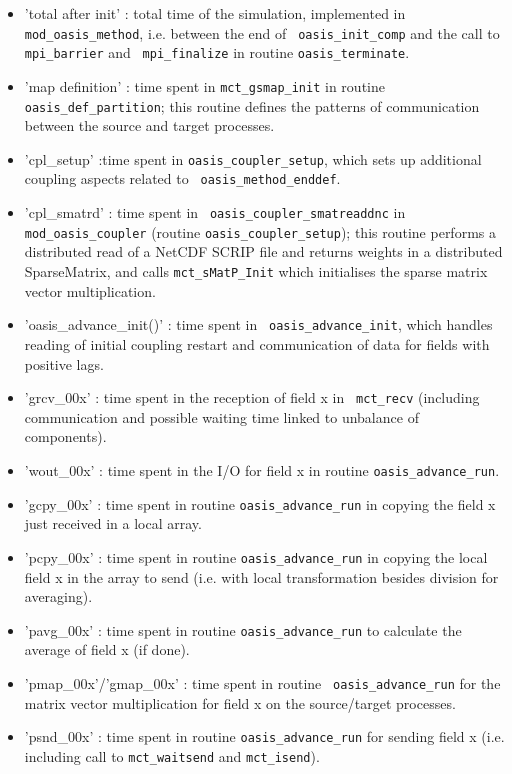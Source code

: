 \begin{itemize}
\item {'total after init'} : total time of the simulation, implemented
  in {\tt mod\_oasis\_method}, i.e. between the end of {\tt
    oasis\_init\_comp} and the call to {\tt mpi\_barrier} and {\tt
    mpi\_finalize} in routine {\tt oasis\_terminate}.
\item {'map definition'} : time spent in {\tt mct\_gsmap\_init} in
  routine {\tt oasis\_def\_partition}; this routine defines the
  patterns of communication between the source and target processes.
\item {'cpl\_setup'} :time spent in {\tt oasis\_coupler\_setup}, which
  sets up additional coupling aspects related to {\tt
    oasis\_method\_enddef}.
\item {'cpl\_smatrd'} : time spent in {\tt
    oasis\_coupler\_smatreaddnc} in {\tt mod\_oasis\_coupler} (routine
  {\tt oasis\_coupler\_setup}); this routine performs a distributed
  read of a NetCDF SCRIP file and returns weights in a distributed
  SparseMatrix, and calls {\tt mct\_sMatP\_Init} which initialises the
  sparse matrix vector multiplication.
\item {'oasis\_advance\_init()'} : time spent in {\tt
    oasis\_advance\_init}, which handles reading of initial coupling
  restart and communication of data for fields with positive lags.
\item {'grcv\_00x'} : time spent in the reception of field x in {\tt
    mct\_recv} (including communication and possible waiting time
  linked to unbalance of components).
\item {'wout\_00x'} : time spent in the I/O for field x in routine
  {\tt oasis\_advance\_run}.
\item {'gcpy\_00x'} : time spent in routine {\tt oasis\_advance\_run}
  in copying the field x just received in a local array.
\item {'pcpy\_00x'} : time spent in routine {\tt oasis\_advance\_run}
  in copying the local field x in the array to send (i.e. with local
  transformation besides division for averaging).
\item {'pavg\_00x'} : time spent in routine {\tt oasis\_advance\_run}
  to calculate the average of field x (if done).
\item {'pmap\_00x'/'gmap\_00x'} : time spent in routine {\tt
    oasis\_advance\_run} for the matrix vector multiplication for
  field x on the source/target processes.
\item {'psnd\_00x'} : time spent in routine {\tt oasis\_advance\_run}
  for sending field x (i.e. including call to {\tt mct\_waitsend} and
  {\tt mct\_isend}).
\end{itemize}

